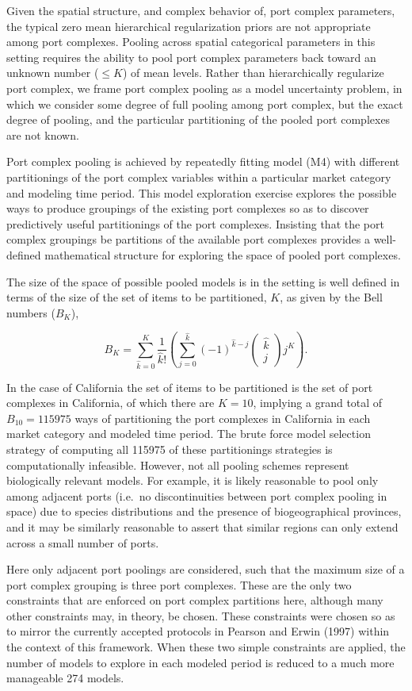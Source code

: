 \documentclass[12pt]{article}
\begin{document}
Given the spatial structure, and complex behavior of, port complex
parameters, the typical zero mean hierarchical regularization priors are
not appropriate among port complexes. Pooling across spatial categorical
parameters in this setting requires the ability to pool port complex
parameters back toward an unknown number (\(\le K\)) of mean levels.
Rather than hierarchically regularize port complex, we frame port
complex pooling as a model uncertainty problem, in which we consider
some degree of full pooling among port complex, but the exact degree of
pooling, and the particular partitioning of the pooled port complexes
are not known.

Port complex pooling is achieved by repeatedly fitting model (M4) with
different partitionings of the port complex variables within a
particular market category and modeling time period. This model
exploration exercise explores the possible ways to produce groupings of
the existing port complexes so as to discover predictively useful
partitionings of the port complexes. Insisting that the port complex
groupings be partitions of the available port complexes provides a
well-defined mathematical structure for exploring the space of pooled
port complexes.

The size of the space of possible pooled models is in the setting is
well defined in terms of the size of the set of items to be partitioned,
\(K\), as given by the Bell numbers (\(B_K\)),

\[B_K=\sum_{\hat k=0}^{K} \frac{1}{\hat k!} \left( \sum_{j=0}^{\hat k} (-1)^{\hat k -j} \left(\substack{\hat k \\ j}\right) j^K \right).\]

In the case of California the set of items to be partitioned is the set
of port complexes in California, of which there are \(K=10\), implying a
grand total of \(B_{10}=115975\) ways of partitioning the port complexes
in California in each market category and modeled time period. The brute
force model selection strategy of computing all 115975 of these
partitionings strategies is computationally infeasible. However, not all
pooling schemes represent biologically relevant models. For example, it
is likely reasonable to pool only among adjacent ports (i.e.~no
discontinuities between port complex pooling in space) due to species
distributions and the presence of biogeographical provinces, and it may
be similarly reasonable to assert that similar regions can only extend
across a small number of ports.

Here only adjacent port poolings are considered, such that the maximum
size of a port complex grouping is three port complexes. These are the
only two constraints that are enforced on port complex partitions here,
although many other constraints may, in theory, be chosen. These
constraints were chosen so as to mirror the currently accepted protocols
in Pearson and Erwin (1997) within the context of this framework. When
these two simple constraints are applied, the number of models to
explore in each modeled period is reduced to a much more manageable 274
models.
\end{document}
